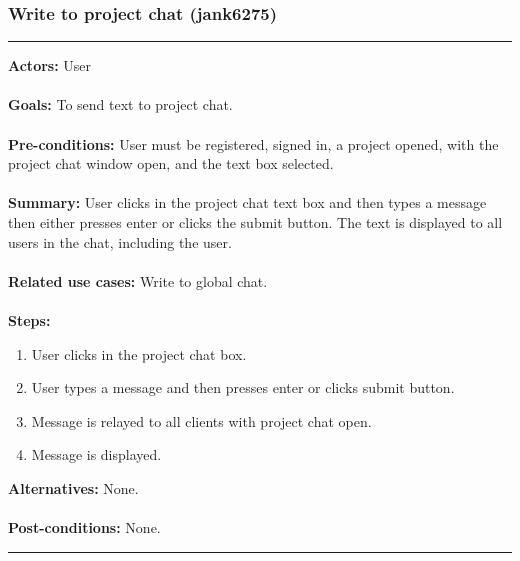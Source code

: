 \documentclass[11pt]{report}
\begin{document}
\subsubsection{Write to project chat (jank6275)}
\vspace{2pt}
\hrule
\vspace{8pt}
 \textbf{Actors:} User \\ \\
\textbf{Goals:} To send text to project chat. \\ \\
 \textbf{Pre-conditions:} User must be registered, signed in, a project opened, with the project chat window open, and the text box selected.  \\ \\
 \textbf{Summary:} User clicks in the project chat text box and then types a message then either presses enter or clicks the submit button. The text is displayed to all users in the chat, including the user. \\ \\
\textbf{Related use cases:} Write to global chat. \\ \\
\textbf{Steps:} \begin{enumerate}
  \item User clicks in the project chat box.
  \item User types a message and then presses enter or clicks submit button.
  \item Message is relayed to all clients with project chat open.
  \item Message is displayed.
 \end{enumerate}
 \textbf{Alternatives:} None. \\ \\
 \textbf{Post-conditions:} None. \\
\vspace{8pt}
\hrule
\newpage
\end{document}

